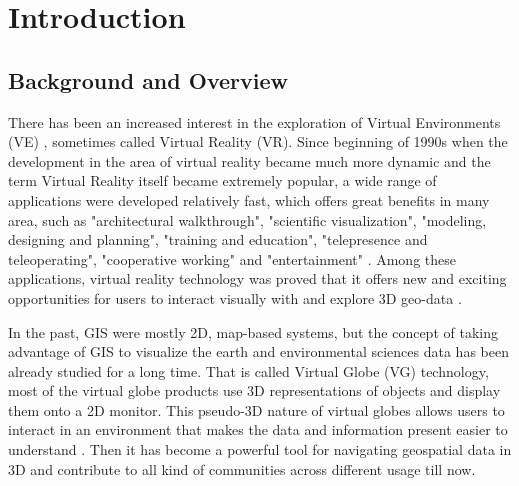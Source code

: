 \label{chapter-introduction}
\chapter{Introduction}

\section{Background and Overview}

There has been an increased interest in the exploration of Virtual Environments (VE) \parencite{huang.java-cgi-vr.2002}, sometimes called Virtual Reality (VR). Since beginning of 1990s when the development in the area of virtual reality became much more dynamic and the term Virtual Reality itself became extremely popular, a wide range of applications were developed relatively fast, which offers great benefits in many area, such as "architectural walkthrough", "scientific visualization", "modeling, designing and planning", "training and education", "telepresence and teleoperating", "cooperative working" and "entertainment" \parencite{mazuryk.vr.1996}. Among these applications, virtual reality technology was proved that it offers new and exciting opportunities for users to interact visually with and explore 3D geo-data \parencite{huang.java-cgi-vr.2002}.

In the past, GIS were mostly 2D, map-based systems, but the concept of taking advantage of GIS to visualize the earth and environmental sciences data has been already studied for a long time. That is called Virtual Globe (VG) technology, most of the virtual globe products use 3D representations of objects and display them onto a 2D monitor. This pseudo-3D nature of virtual globes allows users to interact in an environment that makes the data and information present easier to understand \parencite{tuttle.virtual-globes.2008}. Then it has become a powerful tool for navigating geospatial data in 3D and contribute to all kind of communities across different usage till now. 

